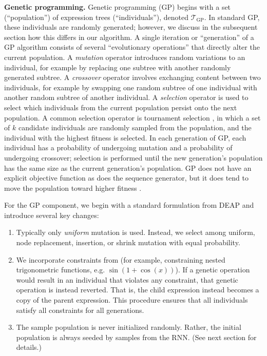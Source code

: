 \documentclass{article}
\begin{document}
\textbf{Genetic programming.}
Genetic programming (GP) begins with a set (``population'') of expression trees (``individuals''), denoted $\mathcal{T}_\textrm{GP}$.
In standard GP, these individuals are randomly generated; however, we discuss in the subsequent section how this differs in our algorithm.
A single iteration or ``generation'' of a GP algorithm consists of several ``evolutionary operations'' that directly alter the current population.
A \textit{mutation} operator introduces random variations to an individual, for example by replacing one subtree with another randomly generated subtree.
A \textit{crossover} operator involves exchanging content between two individuals, for example by swapping one random subtree of one individual with another random subtree of another individual.
A \textit{selection} operator is used to select which individuals from the current population persist onto the next population.
A common selection operator is tournament selection \citep{koza1992genetic}, in which a set of $k$ candidate individuals are randomly sampled from the population, and the individual with the highest fitness is selected.
In each generation of GP, each individual has a probability of undergoing mutation and a probability of undergoing crossover; selection is performed until the new generation's population has the same size as the current generation's population.
GP does not have an explicit objective function as does the sequence generator, but it does tend to move the population toward higher fitness \citep{petronski2018gprl}.

For the GP component, we begin with a standard formulation from DEAP \citep{deap2012} and introduce several key changes:
\begin{enumerate}
    \item Typically only \emph{uniform} mutation is used.
    Instead, we select among uniform, node replacement, insertion, or shrink mutation with equal probability.
    \item We incorporate constraints from \citet{petersen2019deep} (for example, constraining nested trigonometric functions, e.g. $\sin(1 + \cos(x))$).
    If a genetic operation would result in an individual that violates any constraint, that genetic operation is instead reverted.
    That is, the child expression instead becomes a copy of the parent expression.
    This procedure ensures that all individuals satisfy all constraints for all generations.
    \item The sample population is never initialized randomly.
    Rather, the initial population is always seeded by samples from the RNN.
    (See next section for details.)
\end{enumerate}
\end{document}
